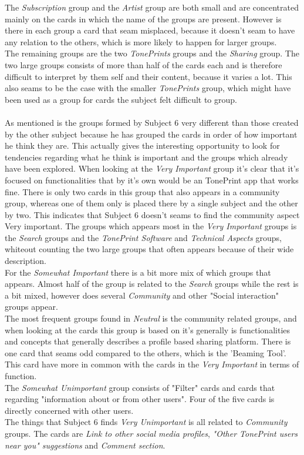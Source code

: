 The \textit{Subscription} group and the \textit{Artist} group are both small and are concentrated mainly on the cards in which the name of the groups are present. However is there in each group a card that seam misplaced, because it doesn't seam to have any relation to the others, which is more likely to happen for larger groups.\\
The remaining groups are the two \textit{TonePrints} groups and the \textit{Sharing} group. The two large groups consists of more than half of the cards each and is therefore difficult to interpret by them self and their content, because it varies a lot. This also seams to be the case with the smaller \textit{TonePrints} group, which might have been used as a group for cards the subject felt difficult to group. \\
\\
As mentioned is the groups formed by Subject 6 very different than those created by the other subject because he has grouped the cards in order of how important he think they are. This actually gives the interesting opportunity to look for tendencies regarding what he think is important and the groups which already have been explored. When looking at the \textit{Very Important} group it's clear that it's focused on functionalities that by it's own would be an TonePrint app that works fine. There is only two cards in this group that also appears in a community group, whereas one of them only is placed there by a single subject and the other by two. This indicates that Subject 6 doesn't seams to find the community aspect Very important. The groups which appears most in the \textit{Very Important} groups is the \textit{Search} groups and the \textit{TonePrint Software} and \textit{Technical Aspects} groups, whiteout counting the two large groups that often appears because of their wide description.\\
For the \textit{Somewhat Important} there is a bit more mix of which groups that appears. Almost half of the group is related to the \textit{Search} groups while the rest is a bit mixed, however does several \textit{Community} and other "Social interaction" groups appear.\\
The most frequent groups found in \textit{Neutral} is the community related groups, and when looking at the cards this group is based on it's generally is functionalities and concepts that generally describes a profile based sharing platform. There is one card that seams odd compared to the others, which is the 'Beaming Tool'. This card have more in common with the cards in the \textit{Very Important} in terms of function.\\
The \textit{Somewhat Unimportant} group consists of "Filter" cards and cards that regarding "information about or from other users". Four of the five cards is directly concerned with other users.\\
The things that Subject 6 finds \textit{Very Unimportant} is all related to \textit{Community} groups. The cards are \textit{Link to other social media profiles}, \textit{"Other TonePrint users near you" suggestions} and \textit{Comment section}.\\

